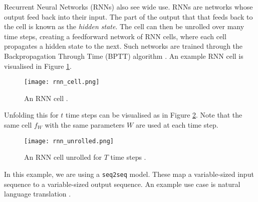 Recurrent Neural Networks (RNNs) also see wide use.
RNNs are networks whose output feed back into their input.
The part of the output that that feeds back to the cell is known as the \textit{hidden state}.
The cell can then be unrolled over many time steps, creating a feedforward network of RNN cells, where each cell propagates a hidden state to the next.
Such networks are trained through the Backpropagation Through Time (BPTT) algorithm \cite{Robinson1987-rnn, Mozer1989-bptt, Werbos1990-bptt}.
An example RNN cell is visualised in Figure \ref{fig:2-rnn-cell}.
\begin{figure}[h]
    \centering
    \texttt{[image: rnn\_cell.png]}
    \caption{An RNN cell \cite[p.~22]{cs231n-rnns}.}
    \label{fig:2-rnn-cell}
\end{figure}

Unfolding this for \(t\) time steps can be visualised as in Figure \ref{fig:2-rnn-unfolded}.
Note that the same cell \(f_W\) with the same parameters \(W\) are used at each time step.

\begin{figure}[h]
    \centering
    \texttt{[image: rnn\_unrolled.png]}
    \caption{An RNN cell unrolled for \(T\) time steps \cite[p.~29]{cs231n-rnns}.}
    \label{fig:2-rnn-unfolded}
\end{figure}
In this example, we are using a \texttt{seq2seq} model.
These map a variable-sized input sequence to a variable-sized output sequence.
An example use case is natural language translation \cite{GoogleAI-mt}.
